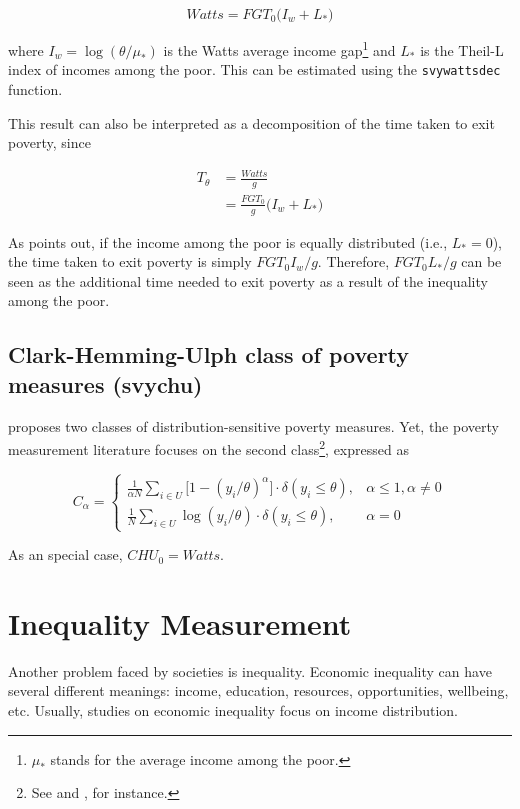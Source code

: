 \documentclass[]{book}
\let\rmarkdownfootnote\footnote%
\def\footnote{\protect\rmarkdownfootnote}
\begin{document}
\[
Watts = FGT_0 \big( I_w + L_* \big)
\]

where \(I_w = \log(\theta/\mu_*)\) is the Watts average income
gap\footnote{\(\mu_*\) stands for the average income among the poor.}
and \(L_*\) is the Theil-L index of incomes among the poor. This can be
estimated using the \texttt{svywattsdec} function.

This result can also be interpreted as a decomposition of the time taken
to exit poverty, since

\[
\begin{aligned}
T_\theta &= \frac{Watts}{g} \\ 
&= \frac{FGT_0}{g} \big( I_w + L_* \big)
\end{aligned}
\]

As \citet{murdoch1998} points out, if the income among the poor is
equally distributed (i.e., \(L_*=0\)), the time taken to exit poverty is
simply \(FGT_0 I_w / g\). Therefore, \(FGT_0 L_* / g\) can be seen as
the additional time needed to exit poverty as a result of the inequality
among the poor.

\section{Clark-Hemming-Ulph class of poverty measures
(svychu)}\label{clark-hemming-ulph-class-of-poverty-measures-svychu}

\citet{clark1981} proposes two classes of distribution-sensitive poverty
measures. Yet, the poverty measurement literature focuses on the second
class\footnote{See \citet{atkinson1987} and \citet{verma2011}, for
  instance.}, expressed as

\[
C_\alpha = \begin{cases}
    \frac{1}{\alpha N} \sum_{i \in U} \big[ 1-(y_i/\theta)^\alpha \big] \cdot \delta ( y_i \leqslant \theta ) , & \alpha \leqslant 1 , \alpha \neq 0 \\
    \frac{1}{N} \sum_{i \in U} \log (y_i/\theta) \cdot \delta ( y_i \leqslant \theta ) , &  \alpha = 0
\end{cases}
\]

As an special case, \(CHU_0 = Watts\).

\chapter{Inequality Measurement}\label{inequality}

Another problem faced by societies is inequality. Economic inequality
can have several different meanings: income, education, resources,
opportunities, wellbeing, etc. Usually, studies on economic inequality
focus on income distribution.
\end{document}
